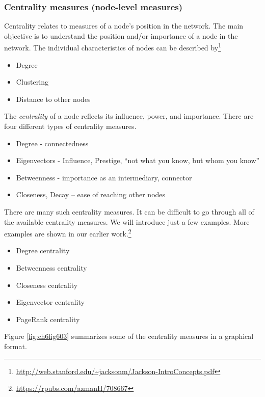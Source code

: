 \documentclass[
]{article}
\providecommand{\tightlist}{%
  \setlength{\itemsep}{0pt}\setlength{\parskip}{0pt}}
\begin{document}
\hypertarget{centrality-measures-node-level-measures}{%
\subsubsection{Centrality measures (node-level measures)}\label{centrality-measures-node-level-measures}}

Centrality relates to measures of a node's position in the network. The main objective is to understand the position and/or importance of a node in the network. The individual characteristics of nodes can be described by\footnote{\url{http://web.stanford.edu/~jacksonm/Jackson-IntroConcepts.pdf}}

\begin{itemize}
\tightlist
\item
  Degree
\item
  Clustering
\item
  Distance to other nodes
\end{itemize}

The \emph{centrality} of a node reflects its influence, power, and importance. There are four different types of centrality measures.

\begin{itemize}
\tightlist
\item
  Degree - connectedness
\item
  Eigenvectors - Influence, Prestige, ``not what you know, but whom you know''
\item
  Betweenness - importance as an intermediary, connector
\item
  Closeness, Decay -- ease of reaching other nodes
\end{itemize}

There are many such centrality measures. It can be difficult to go through all of the available centrality measures. We will introduce just a few examples. More examples are shown in our earlier work.\footnote{\url{https://rpubs.com/azmanH/708667}}

\begin{itemize}
\tightlist
\item
  Degree centrality
\item
  Betweenness centrality
\item
  Closeness centrality
\item
  Eigenvector centrality
\item
  PageRank centrality
\end{itemize}

Figure \ref{fig:ch6fig603} summarizes some of the centrality measures in a graphical format.
\end{document}
